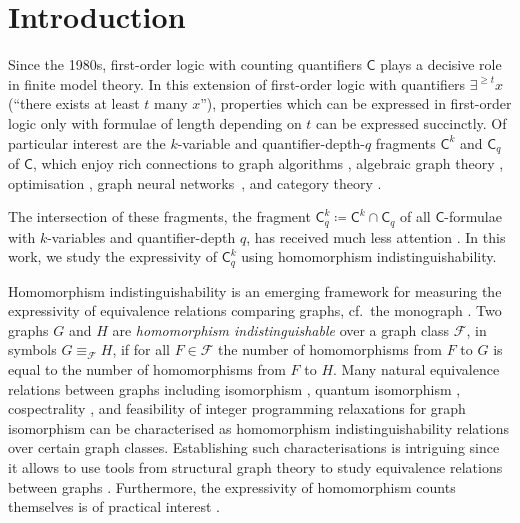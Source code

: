 \documentclass{lmcs}
\theoremstyle{plain}\newtheorem{claim}[thm]{Claim}   %
\begin{document}
\section{Introduction}
\label{ch:intro}
Since the 1980s, first-order logic with counting quantifiers $\mathsf{C}$ plays a decisive role in finite model theory.
In this extension of first-order logic with quantifiers $\exists^{\geq t} x$ (\enquote{there exists at least $t$ many $x$}), properties which can be expressed in first-order logic only with formulae of length depending on $t$ can be expressed succinctly.
Of particular interest are the $k$\nobreakdash-variable and quantifier-depth-$q$ fragments $\mathsf{C}^k$ and $\mathsf{C}_q$ of $\mathsf{C}$, which
enjoy rich connections to graph algorithms \cite{Dvorak_recognizing_2010}, algebraic graph theory \cite{dell_lovasz_2018,Grohe_homomorphism-tensors_2022}, optimisation \cite{Grohe_homomorphism-tensors_2022,roberson_lasserre_2023}, graph neural networks~\cite{morris_weisfeiler_2019,Xu_gnn_2019,grohe_logic_2021}, and category theory \cite{dawar_lovasz-type_2021,Abramsky_pebbling_2017}.

The intersection of these fragments, the fragment $\mathsf{C}^k_q \coloneqq \mathsf{C}^k \cap \mathsf{C}_q$ of all $\mathsf{C}$-formulae with $k$-variables and quantifier-depth $q$, has received much less attention \cite{rattan_weisfeiler-leman_2023}. In this work, we study the expressivity of $\mathsf{C}^k_q$ using homomorphism indistinguishability.

Homomorphism indistinguishability is an emerging framework for measuring the expressivity of equivalence relations comparing graphs, cf.\ the monograph \cite{seppelt_homomorphism_2024}. Two graphs $G$ and $H$ are \emph{homomorphism indistinguishable} over a graph class $\mathcal{F}$, in symbols $G \equiv_{\mathcal{F}} H$, if for all $F \in \mathcal{F}$ the number of homomorphisms from $F$ to $G$ is equal to the number of homomorphisms from $F$ to $H$. Many natural equivalence relations between graphs including isomorphism \cite{Lovasz_isomorphism_1967}, quantum isomorphism \cite{mancinska_quantum_2020}, cospectrality \cite{dell_lovasz_2018}, and feasibility of integer programming relaxations for graph isomorphism \cite{Grohe_homomorphism-tensors_2022,roberson_lasserre_2023} can be characterised as homomorphism indistinguishability relations over certain graph classes. Establishing such characterisations is intriguing since it allows to use tools from structural graph theory to study equivalence relations between graphs \cite{roberson_oddomorphisms_2022,seppelt_logical_2023}.
Furthermore, the expressivity of homomorphism counts themselves is of practical interest \cite{nguyen_graph_2020,grohe_word2vec_2020}.
\end{document}
